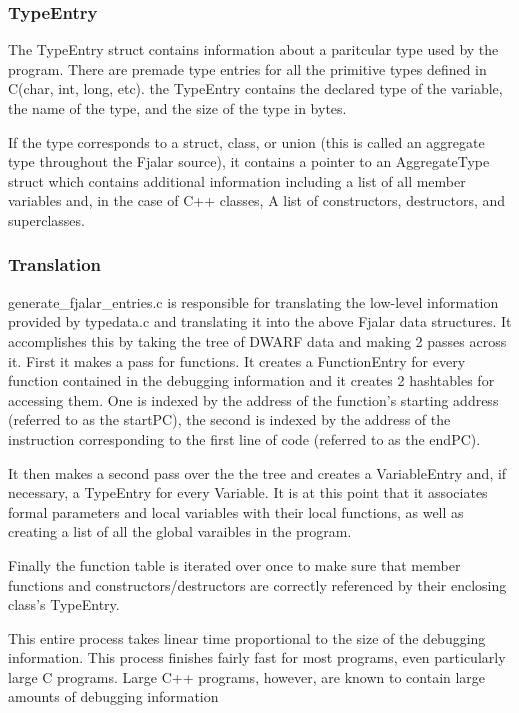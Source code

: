 \documentclass[11pt]{article}
\begin{document}
\subsubsection{TypeEntry}
The TypeEntry struct contains information about a paritcular type used
by the program. There are premade type entries for all the primitive
types defined in C(char, int, long, etc). the TypeEntry contains the
declared type of the variable, the name of the type, and the size of
the type in bytes.

If the type corresponds to a struct, class, or union (this is called
an aggregate type throughout the Fjalar source), it contains a pointer
to an AggregateType struct which contains additional information
including a list of all member variables and, in the case of C++
classes, A list of constructors, destructors, and superclasses.

\subsubsection{Translation}
generate\_fjalar\_entries.c is responsible for translating the low-level
information provided by typedata.c and translating it into the above
Fjalar data structures. It accomplishes this by taking the tree of
DWARF data and making 2 passes across it. First it makes a pass
for functions. It creates a FunctionEntry for every function contained
in the debugging information and it creates 2 hashtables for accessing
them. One is indexed by the address of the function's starting
address (referred to as the startPC), the second is indexed by the
address of the instruction corresponding to the first line of code
(referred to as the endPC). 

It then makes a second pass over the the tree and creates a 
VariableEntry and, if necessary, a TypeEntry for every Variable. It is
at this point that it associates formal parameters and local variables
with their local functions, as well as creating a list of all the
global varaibles in the program.

Finally the function table is iterated over once to make sure that
member functions and constructors/destructors are correctly referenced
by their enclosing class's TypeEntry.

This entire process takes linear time proportional to the size of the
debugging information. This process finishes fairly fast for most
programs, even particularly large C programs. Large C++ programs,
however, are known to contain large amounts of debugging information
\end{document}
